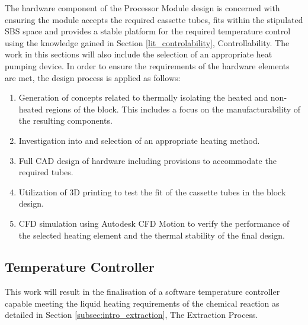 The hardware component of the Processor Module design is concerned with ensuring the module accepts the required cassette tubes, fits within the stipulated SBS space and provides a stable platform for the required temperature control using the knowledge gained in Section \ref{lit_controlability}, Controllability. The work in this sections will also include the selection of an appropriate heat pumping device. In order to ensure the requirements of the hardware elements are met, the design process is applied as follows:
\begin{enumerate}
	\item Generation of concepts related to thermally isolating the heated and non-heated regions of the block. This includes a focus on the manufacturability of the resulting components.
	\item Investigation into and selection of an appropriate heating method.
	\item Full CAD design of hardware including provisions to accommodate the required tubes.
	\item Utilization of 3D printing to test the fit of the cassette tubes in the block design.
	\item CFD simulation using Autodesk CFD Motion to verify the performance of the selected heating element and the thermal stability of the final design. 
\end{enumerate} 

\subsection{Temperature Controller}
\label{Method_controller}

This work will result in the finalisation of a software temperature controller capable meeting the liquid heating requirements of the chemical reaction as detailed in Section \ref{subsec:intro_extraction}, The Extraction Process.

